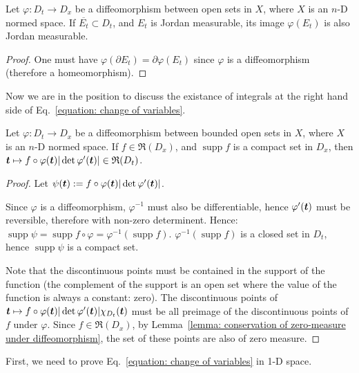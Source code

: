 \documentclass[openany]{book}
\DeclareMathOperator{\supp}{supp}
\begin{document}
\begin{lemma}
	\label{lemma: conservation of Jordan-measurability under diffeomorphism}
	Let $\varphi \colon D_t \to D_x$ be a diffeomorphism between open sets in $X$, where $X$ is an $n$-D normed space.
	If $\overline{E_t} \subset D_t$, and $E_t$ is Jordan measurable, its image $\varphi(E_t)$ is also Jordan measurable.
\end{lemma}
\begin{proof}
	One must have $\varphi(\partial E_t) = \partial \varphi(E_t)$ since $\varphi$ is a diffeomorphism (therefore a homeomorphism).
\end{proof}

Now we are in the position to discuss the existance of integrals at the right hand side of Eq.~\ref{equation: change of variables}.

\begin{lemma}
	Let $\varphi \colon D_t \to D_x$ be a diffeomorphism between bounded open sets in $X$, where $X$ is an $n$-D normed space. 
	If $f \in \mathfrak R(D_x)$, and $\supp f$ is a compact set in $D_x$, then $\boldsymbol{t} \mapsto f \circ \varphi(\boldsymbol{t}) |\det \varphi'(\boldsymbol{t})| \in \mathfrak R(D_t)$. 
\end{lemma}
\begin{proof}
	Let $\psi(\boldsymbol{t}) := f \circ \varphi (\boldsymbol{t}) |\det \varphi'(\boldsymbol{t})|$.

	Since $\varphi$ is a diffeomorphism, $\varphi^{-1}$ must also be differentiable, hence $\varphi'(\boldsymbol{t})$ must be reversible, therefore with non-zero determinent. 
	Hence: $\supp \psi = \supp f \circ \varphi = \varphi^{-1}(\supp f)$. 
	$\varphi^{-1}(\supp f)$ is a closed set in $D_t$, hence $\supp \psi$ is a compact set.

	Note that the discontinuous points must be contained in the support of the function (the complement of the support is an open set where the value of the function is always a constant: zero).
	The discontinuous points of $\boldsymbol{t} \mapsto f \circ \varphi(\boldsymbol{t}) |\det \varphi'(\boldsymbol{t})| \chi_{D_t}(\boldsymbol{t})$ must be all preimage of the discontinuous points of $f$ under $\varphi$. 
	Since $f \in \mathfrak R(D_x)$, by Lemma~\ref{lemma: conservation of zero-measure under diffeomorphism}, the set of these points are also of zero measure.
\end{proof}

First, we need to prove Eq.~\ref{equation: change of variables} in 1-D space.
\end{document}
